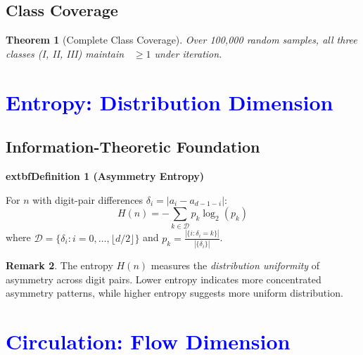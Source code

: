 \documentclass[11pt,a4paper]{article}
\theoremstyle{plain}
\newtheorem{theorem}{Theorem}[section]
\theoremstyle{definition}
\newtheorem{remark}[theorem]{Remark}
\DeclareMathOperator{\Arobust}{A^{\text{(robust)}}}
\newenvironment{definitionbox}
    {\begin{center}\begin{minipage}{0.95\textwidth}\color{blue}\bfseries}
    {\end{minipage}\end{center}}
\begin{document}
\subsection{Class Coverage}

\begin{theorem}[Complete Class Coverage]\label{thm:class_coverage}
Over 100,000 random samples, all three classes (I, II, III) maintain $\Arobust \geq 1$ under iteration.
\end{theorem}


\section{\textcolor{blue}{Entropy: Distribution Dimension}}

\subsection{Information-Theoretic Foundation}

\begin{definitionbox}
	extbf{Definition 1 (Asymmetry Entropy)}\label{def:asymmetry_entropy}

For $n$ with digit-pair differences $\delta_i = |a_i - a_{d-1-i}|$:
\[
H(n) = -\sum_{k \in \mathcal{D}} p_k \log_2(p_k)
\]
where $\mathcal{D} = \{\delta_i : i = 0, \ldots, \lfloor d/2 \rfloor\}$ and $p_k = \frac{|\{i : \delta_i = k\}|}{|\{\delta_i\}|}$.
\end{definitionbox}

\begin{remark}
The entropy $H(n)$ measures the \emph{distribution uniformity} of asymmetry across digit pairs. Lower entropy indicates more concentrated asymmetry patterns, while higher entropy suggests more uniform distribution.
\end{remark}

\section{\textcolor{blue}{Circulation: Flow Dimension}}
\end{document}
